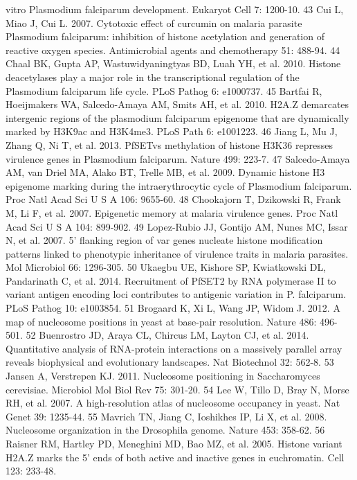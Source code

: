 vitro Plasmodium falciparum development. Eukaryot Cell 7: 1200-10.
43  Cui L, Miao J, Cui L. 2007. Cytotoxic effect of curcumin on malaria
parasite Plasmodium falciparum: inhibition of histone acetylation and
generation of reactive oxygen species. Antimicrobial agents and chemotherapy
51: 488-94.
44  Chaal BK, Gupta AP, Wastuwidyaningtyas BD, Luah YH, et al. 2010. Histone
deacetylases play a major role in the transcriptional regulation of the
Plasmodium falciparum life cycle. PLoS Pathog 6: e1000737.
45  Bartfai R, Hoeijmakers WA, Salcedo-Amaya AM, Smits AH, et al. 2010. H2A.Z
demarcates intergenic regions of the plasmodium falciparum epigenome that are
dynamically marked by H3K9ac and H3K4me3. PLoS Path 6: e1001223.
46  Jiang L, Mu J, Zhang Q, Ni T, et al. 2013. PfSETvs methylation of histone
H3K36 represses virulence genes in Plasmodium falciparum. Nature 499: 223-7.
47  Salcedo-Amaya AM, van Driel MA, Alako BT, Trelle MB, et al. 2009. Dynamic
histone H3 epigenome marking during the intraerythrocytic cycle of Plasmodium
falciparum. Proc Natl Acad Sci U S A 106: 9655-60.
48  Chookajorn T, Dzikowski R, Frank M, Li F, et al. 2007. Epigenetic memory
at malaria virulence genes. Proc Natl Acad Sci U S A 104: 899-902.
49  Lopez-Rubio JJ, Gontijo AM, Nunes MC, Issar N, et al. 2007. 5' flanking
region of var genes nucleate histone modification patterns linked to
phenotypic inheritance of virulence traits in malaria parasites. Mol Microbiol
66: 1296-305.
50  Ukaegbu UE, Kishore SP, Kwiatkowski DL, Pandarinath C, et al. 2014.
Recruitment of PfSET2 by RNA polymerase II to variant antigen encoding loci
contributes to antigenic variation in P. falciparum. PLoS Pathog 10: e1003854.
51  Brogaard K, Xi L, Wang JP, Widom J. 2012. A map of nucleosome positions in
yeast at base-pair resolution. Nature 486: 496-501.
52  Buenrostro JD, Araya CL, Chircus LM, Layton CJ, et al. 2014. Quantitative
analysis of RNA-protein interactions on a massively parallel array reveals
biophysical and evolutionary landscapes. Nat Biotechnol 32: 562-8.
53  Jansen A, Verstrepen KJ. 2011. Nucleosome positioning in Saccharomyces
cerevisiae. Microbiol Mol Biol Rev 75: 301-20.
54  Lee W, Tillo D, Bray N, Morse RH, et al. 2007. A high-resolution atlas of
nucleosome occupancy in yeast. Nat Genet 39: 1235-44.
55  Mavrich TN, Jiang C, Ioshikhes IP, Li X, et al. 2008. Nucleosome
organization in the Drosophila genome. Nature 453: 358-62.
56  Raisner RM, Hartley PD, Meneghini MD, Bao MZ, et al. 2005. Histone variant
H2A.Z marks the 5' ends of both active and inactive genes in euchromatin. Cell
123: 233-48.
